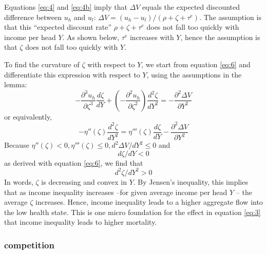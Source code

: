 \documentclass[a4paper,12pt]{article}
\begin{document}
Equations \eqref{eq:4} and \eqref{eq:4b} imply that \(\Delta V\) equals the expected discounted difference between \(u_h\) and \(u_l\): \(\Delta V = (u_h-u_l)/(\rho+\zeta+\tau^e)\). The assumption is that this ``expected discount rate'' \(\rho+\zeta+\tau^e\) does not fall too quickly with income per head \(Y\). As shown below, \(\tau^e\) increases with \(Y\), hence the assumption is that \(\zeta\) does not fall too quickly with \(Y\).

To find the curvature of \(\zeta\) with respect to \(Y\), we start from equation \eqref{eq:6} and differentiate this expression with respect to \(Y\), using the assumptions in the lemma:
\begin{equation}
\label{eq:33}
-\frac{\partial^3 u_h}{\partial \zeta^3} \frac{d\zeta}{dY} + \left(-\frac{\partial^2 u_h}{\partial \zeta^2} \right) \frac{d^2 \zeta}{dY^2} = - \frac{\partial^2 \Delta V}{\partial Y^2}
\end{equation}
or equivalently,
\begin{equation}
\label{eq:34}
- \eta''(\zeta) \frac{d^2 \zeta}{dY^2} = \eta'''(\zeta) \frac{d\zeta}{dY} - \frac{\partial^2 \Delta V}{\partial Y^2}
\end{equation}
Because \(\eta''(\zeta) <0, \eta'''(\zeta) \leq 0, d^2 \Delta V/dY^2 \leq 0\) and
\begin{equation}
\label{eq:40}
    d\zeta/dY < 0
\end{equation}
as derived with equation \eqref{eq:6}, we find that
\begin{equation}
\label{eq:30}
d^2 \zeta/dY^2 >0
\end{equation}
In words, \(\zeta\) is decreasing and convex in \(Y\). By Jensen's inequality, this implies that as income inequality increases --for given average income per head \(Y\) -- the average \(\zeta\) increases. Hence, income inequality leads to a higher aggregate flow into the low health state. This is one micro foundation for the effect in equation \eqref{eq:3} that income inequality leads to higher mortality.


\subsubsection{competition}
\label{sec:org887f4ce}
\end{document}
